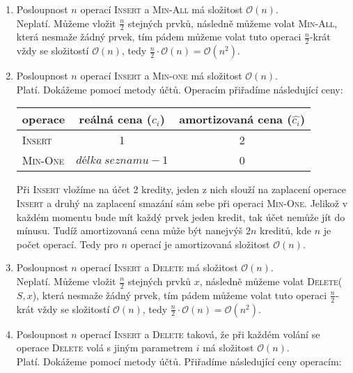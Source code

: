 \documentclass[12pt]{iv003}
\begin{document}
\begin{enumerate}
	\item Posloupnost $n$ operací \textsc{Insert} a \textsc{Min-All} má složitost $\mathcal{O}(n)$.\\
	Neplatí. Můžeme vložit $\frac{n}{2}$ stejných prvků, následně můžeme volat \textsc{Min-All}, která nesmaže žádný prvek, tím pádem můžeme volat tuto operaci $\frac{n}{2}$-krát vždy se složitostí $\mathcal{O}(n)$, tedy $\frac{n}{2} \cdot \mathcal{O}(n) = \mathcal{O}(n^{2})$. 
	
	\item Posloupnost $n$ operací \textsc{Insert} a \textsc{Min-one} má složitost $\mathcal{O}(n)$.\\
	Platí. Dokážeme pomocí metody účtů. Operacím přiřadíme následující ceny:
	\begin{center}
	\begin{tabular}{ l | c | c }
		operace 			&	reálná cena ($c_{i}$)	& 	amortizovaná cena ($\widehat{c_{i}}$) \\ \hline \hline
		\textsc{Insert} 	& 	1						&	2 \\
		\textsc{Min-One}	&	$délka\ seznamu - 1$					&	0 \\ \hline 
	\end{tabular}
	\end{center}
	
	Při \textsc{Insert} vložíme na účet 2 kredity, jeden z nich slouží na zaplacení operace \textsc{Insert} a druhý na zaplacení smazání sám sebe při operaci \textsc{Min-One}. Jelikož v každém momentu bude mít každý prvek jeden kredit, tak účet nemůže jít do mínusu. Tudíž amortizovaná cena může být nanejvýš $2n$ kreditů, kde $n$ je počet operací. Tedy pro $n$ operací je amortizovaná složitost $\mathcal{O}(n)$.
	
	\item Posloupnost $n$ operací \textsc{Insert} a \textsc{Delete} má složitost $\mathcal{O}(n)$.\\
	Neplatí. Můžeme vložit $\frac{n}{2}$ stejných prvků $x$, následně můžeme volat \textsc{Delete}($S,x$), která nesmaže žádný prvek, tím pádem můžeme volat tuto operaci $\frac{n}{2}$-krát vždy se složitostí $\mathcal{O}(n)$, tedy $\frac{n}{2} \cdot \mathcal{O}(n) = \mathcal{O}(n^{2})$. 
	
	\item Posloupnost $n$ operací \textsc{Insert} a \textsc{Delete} taková, že při každém volání se operace \textsc{Delete} volá s jiným parametrem $i$ má složitost $\mathcal{O}(n)$.\\
	Platí. Dokážeme pomocí metody účtů. Přiřadíme následující ceny operacím:
	

\end{enumerate}
\end{document}
